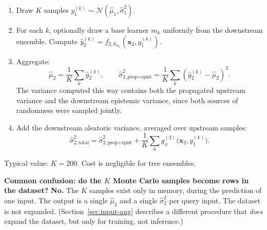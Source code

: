 \documentclass[11pt,a4paper]{article}
\begin{document}
\begin{enumerate}
    \item Draw $K$ samples $y_1^{(k)} \sim \mathcal{N}(\hat\mu_1, \hat\sigma_1^2)$.
    \item For each $k$, optionally draw a base learner $m_k$ uniformly from the downstream ensemble. Compute $\hat y_2^{(k)} = f_{2, \theta_{m_k}}(\bm x_2, y_1^{(k)})$.
    \item Aggregate:
    \[
    \hat\mu_2 = \frac{1}{K}\sum_k \hat y_2^{(k)}, \qquad
    \hat\sigma^2_{2,\text{prop+epist}} = \frac{1}{K}\sum_k (\hat y_2^{(k)} - \hat\mu_2)^2.
    \]
    The variance computed this way contains both the propagated upstream variance and the downstream epistemic variance, since both sources of randomness were sampled jointly.
    \item Add the downstream aleatoric variance, averaged over upstream samples:
    \[
    \hat\sigma^2_{2,\text{total}} = \hat\sigma^2_{2,\text{prop+epist}} + \frac{1}{K}\sum_k g_\phi^{(2)}\big(\bm x_2, y_1^{(k)}\big).
    \]
\end{enumerate}
Typical value: $K = 200$. Cost is negligible for tree ensembles.

\begin{cautionbox}
\textbf{Common confusion: do the $K$ Monte Carlo samples become rows in the dataset?} \textbf{No.} The $K$ samples exist only in memory, during the prediction of one input. The output is a single $\hat\mu_2$ and a single $\hat\sigma^2_2$ per query input. The dataset is not expanded. (Section~\ref{sec:input-aug} describes a different procedure that \emph{does} expand the dataset, but only for training, not inference.)
\end{cautionbox}



\end{document}
